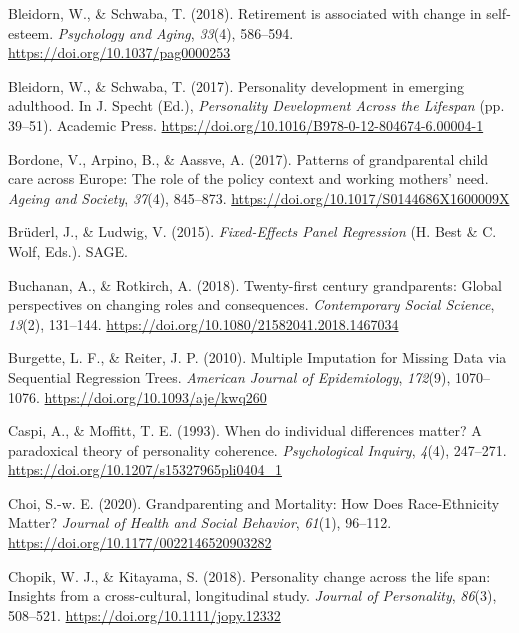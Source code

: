 \documentclass[
  english,
  man, noextraspace]{apa7}
\begin{document}
\leavevmode\hypertarget{ref-bleidornRetirementAssociatedChange2018}{}%
Bleidorn, W., \& Schwaba, T. (2018). Retirement is associated with change in self-esteem. \emph{Psychology and Aging}, \emph{33}(4), 586--594. \url{https://doi.org/10.1037/pag0000253}

\leavevmode\hypertarget{ref-bleidornPersonalityDevelopmentEmerging2017}{}%
Bleidorn, W., \& Schwaba, T. (2017). Personality development in emerging adulthood. In J. Specht (Ed.), \emph{Personality Development Across the Lifespan} (pp. 39--51). Academic Press. \url{https://doi.org/10.1016/B978-0-12-804674-6.00004-1}

\leavevmode\hypertarget{ref-bordonePatternsGrandparentalChild2017}{}%
Bordone, V., Arpino, B., \& Aassve, A. (2017). Patterns of grandparental child care across Europe: The role of the policy context and working mothers' need. \emph{Ageing and Society}, \emph{37}(4), 845--873. \url{https://doi.org/10.1017/S0144686X1600009X}

\leavevmode\hypertarget{ref-bruderlFixedEffectsPanelRegression2015}{}%
Brüderl, J., \& Ludwig, V. (2015). \emph{Fixed-Effects Panel Regression} (H. Best \& C. Wolf, Eds.). SAGE.

\leavevmode\hypertarget{ref-buchananTwentyfirstCenturyGrandparents2018}{}%
Buchanan, A., \& Rotkirch, A. (2018). Twenty-first century grandparents: Global perspectives on changing roles and consequences. \emph{Contemporary Social Science}, \emph{13}(2), 131--144. \url{https://doi.org/10.1080/21582041.2018.1467034}

\leavevmode\hypertarget{ref-burgetteMultipleImputationMissing2010}{}%
Burgette, L. F., \& Reiter, J. P. (2010). Multiple Imputation for Missing Data via Sequential Regression Trees. \emph{American Journal of Epidemiology}, \emph{172}(9), 1070--1076. \url{https://doi.org/10.1093/aje/kwq260}

\leavevmode\hypertarget{ref-caspiWhenIndividualDifferences1993}{}%
Caspi, A., \& Moffitt, T. E. (1993). When do individual differences matter? A paradoxical theory of personality coherence. \emph{Psychological Inquiry}, \emph{4}(4), 247--271. \url{https://doi.org/10.1207/s15327965pli0404_1}

\leavevmode\hypertarget{ref-choiGrandparentingMortalityHow2020}{}%
Choi, S.-w. E. (2020). Grandparenting and Mortality: How Does Race-Ethnicity Matter? \emph{Journal of Health and Social Behavior}, \emph{61}(1), 96--112. \url{https://doi.org/10.1177/0022146520903282}

\leavevmode\hypertarget{ref-chopikPersonalityChangeLife2018}{}%
Chopik, W. J., \& Kitayama, S. (2018). Personality change across the life span: Insights from a cross-cultural, longitudinal study. \emph{Journal of Personality}, \emph{86}(3), 508--521. \url{https://doi.org/10.1111/jopy.12332}
\end{document}
